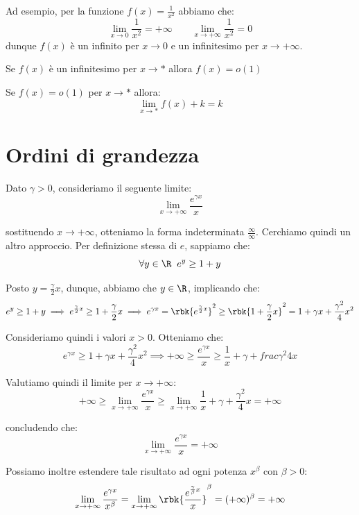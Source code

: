 \documentclass[a4paper, 12pt]{report}
\begin{document}
    Ad esempio, per la funzione $f(x) = \frac{1}{x^2}$ abbiamo che:
    \[\lim_{x \to 0} \frac{1}{x^2} = +\infty \qquad \lim_{x \to +\infty} \frac{1}{x^2} = 0\]
    dunque $f(x)$ è un infinito per $x \to 0$ e un infinitesimo per $x \to +\infty$.
    
    \begin{framedobs}{}
        Se $f(x)$ è un infinitesimo per $x \to *$ allora $f(x) = o(1)$
    \end{framedobs}

    \begin{framedobs}{}
        Se $f(x) = o(1)$ per $x \to *$ allora:
        \[\lim_{x \to *} f(x) + k = k\]
    \end{framedobs}

    \newpage

    \section{Ordini di grandezza}
    \label{ordini}

    Dato $\gamma > 0$, consideriamo il seguente limite:
    \[\lim_{x \to +\infty} \frac{e^{\gamma x}}{x}\]

    sostituendo $x \to +\infty$, otteniamo la forma indeterminata $\frac{\infty}{\infty}$. Cerchiamo quindi un altro approccio. Per definizione stessa di $e$, sappiamo che:
    \[\forall y \in \R \;\; e^y \geq 1+y\]

    Posto $y = \frac{\gamma}{2} x$, dunque, abbiamo che $y \in \R$, implicando che:
    \[e^y \geq 1+y \implies  e^{\frac{\gamma}{2} x} \geq 1 + \frac{\gamma}{2} x \implies e^{\gamma x} = \rbk{e^{\frac{\gamma}{2} x}}^2 \geq \rbk{1 + \frac{\gamma}{2} x }^2 = 1+\gamma x +  \frac{\gamma^2}{4} x^2\]

    Consideriamo quindi i valori $x > 0$. Otteniamo che:
    \[e^{\gamma x} \geq 1+\gamma x +  \frac{\gamma^2}{4} x^2 \implies +\infty \geq \frac{e^{\gamma x}}{x} \geq \frac{1}{x}+\gamma +  frac{\gamma^2}{4} x\]

    Valutiamo quindi il limite per $x \to +\infty$:
    \[+\infty \geq \lim_{x \to +\infty} \frac{e^{\gamma x}}{x} \geq \lim_{x \to +\infty} \frac{1}{x}+\gamma +  \frac{\gamma^2}{4} x = +\infty\]

    concludendo che:
    \[\lim_{x \to +\infty} \frac{e^{\gamma x}}{x} = +\infty\]

    Possiamo inoltre estendere tale risultato ad ogni potenza $x^{\beta}$ con $\beta > 0$:
    \[\lim_{x \to +\infty} \frac{e^{\gamma x}}{x^{\beta}} = \lim_{x \to +\infty} \rbk{\frac{e^{\frac{\gamma}{\beta} x}}{x}}^\beta = (+\infty)^{\beta} = +\infty\]
\end{document}
